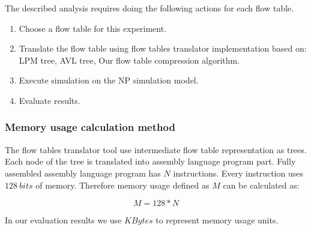 \documentclass[conference]{IEEEtran}
\begin{document}
        The described analysis requires doing the following actions for each flow table.

        \begin{enumerate}
            \item Choose a flow table for this experiment.
            \item Translate the flow table using flow tables translator implementation based on:
                LPM tree, AVL tree, Our flow table compression algorithm.
            \item Execute simulation on the NP simulation model.
            \item Evaluate results.
        \end{enumerate}
        \subsubsection{Memory usage calculation method}
            The flow tables translator tool use intermediate flow table representation as trees.
            Each node of the tree is translated into assembly language program part.
            Fully assembled assembly language program has \(N\) instructions.
            Every instruction uses \(128~bits\) of memory. Therefore memory usage defined as \(M\)
            can be calculated as:
            
            \[M = 128 * N\]

            In our evaluation results we use \(KBytes\) to represent memory usage units. 
\end{document}
